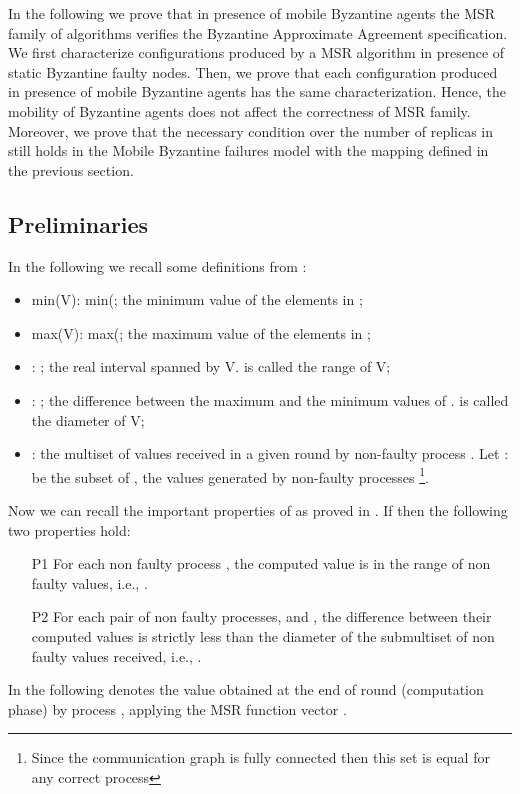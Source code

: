 In the following we prove that in presence of mobile Byzantine agents the MSR family of algorithms verifies the Byzantine Approximate Agreement specification. We first characterize configurations produced by a MSR algorithm in presence of static Byzantine faulty nodes. Then, we prove that each configuration produced in  presence of mobile Byzantine agents has the same characterization. Hence, the mobility of Byzantine agents does not affect the correctness of MSR family. 
Moreover, we prove that the necessary condition over the number of replicas in \cite{KA94} still holds in the Mobile Byzantine failures model with the mapping defined in the previous section. 




\subsection{Preliminaries}\label{ss:preliminaries} In the following we recall some definitions from \cite{DLPS86, KA94} :
\begin{itemize}
	\item{min(V):} min(; the minimum value of the elements in ;
	\item{max(V):} max(; the maximum value of the elements in ;
	\item{:} ; the real interval spanned by V.  is called the range of V;
	\item{:} ; the difference between the maximum and the minimum values of .  is called the diameter of V;
	\item{:} the multiset of values received in a given round  by non-faulty process . Let  {:} be the subset of  , the values generated by non-faulty processes \footnote{Since the communication graph is fully connected then this set is equal for any correct process}.
\end{itemize}

Now we can recall the important properties of  as proved in \cite{KA94}.
If   then the following two properties hold:
	\begin{itemize}
		\item[P1] For each non faulty process , the computed value is in the range of non faulty values, i.e., .
		\item[P2] For each pair of non faulty processes,  and , the difference between their computed values is strictly less than the diameter of the submultiset of non faulty values received, i.e., .
	\end{itemize}
In the following  denotes the value obtained at the end of round  (computation phase) by process , applying the MSR function vector .

